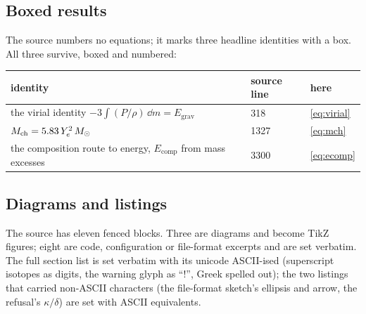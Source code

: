 \subsection{Boxed results}
\label{app:boxed}

The source numbers no equations; it marks three headline identities with a box.
All three survive, boxed and numbered:

\begin{center}
\begin{tabularx}{0.9\textwidth}{@{}Y L{2.2cm} L{2.6cm}@{}}
\toprule
\textbf{identity} & \textbf{source line} & \textbf{here} \\
\midrule
the virial identity $-3\int (P/\rho)\,\dd m = E_{\mathrm{grav}}$ & 318 & \eqref{eq:virial} \\
$M_{\mathrm{ch}} = 5.83\,Y_{e}^2\,M_{\odot}$ & 1327 & \eqref{eq:mch} \\
the composition route to energy, $E_{\mathrm{comp}}$ from mass excesses & 3300 & \eqref{eq:ecomp} \\
\bottomrule
\end{tabularx}
\end{center}

\subsection{Diagrams and listings}
\label{app:diagrams}

The source has eleven fenced blocks. Three are diagrams and become TikZ figures;
eight are code, configuration or file-format excerpts and are set verbatim.
The full section list is set verbatim with its unicode ASCII-ised (superscript
isotopes as digits, the warning glyph as ``!'', Greek spelled out); the two
listings that carried non-ASCII characters (the file-format sketch's ellipsis
and arrow, the refusal's $\kappa/\delta$) are set with ASCII equivalents.

